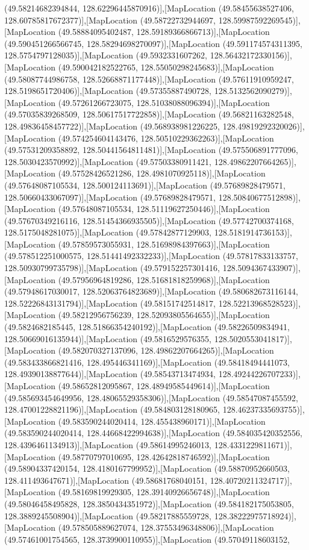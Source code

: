 (49.58214682394844, 128.62296445870916)],[MapLocation (49.58455638527406, 128.60785817672377)],[MapLocation (49.58722732944697, 128.59987592269545)],[MapLocation (49.58884095402487, 128.59189366866713)],[MapLocation (49.590451266566745, 128.58294698270097)],[MapLocation (49.591174574311395, 128.5754797128035)],[MapLocation (49.5932331607262, 128.56432172330156)],[MapLocation (49.590042182522765, 128.55050298245683)],[MapLocation (49.58087744986758, 128.52668871177448)],[MapLocation (49.57611910959247, 128.5198651720406)],[MapLocation (49.57355887490728, 128.5132562090279)],[MapLocation (49.57261266723075, 128.51038088096394)],[MapLocation (49.57035839268509, 128.50617517722858)],[MapLocation (49.56821163282548, 128.49836458457722)],[MapLocation (49.568938981226225, 128.49819292320026)],[MapLocation (49.574254604143476, 128.50510229362263)],[MapLocation (49.57531209358892, 128.50441564811481)],[MapLocation (49.575506891777096, 128.5030423570992)],[MapLocation (49.57503380911421, 128.49862207664265)],[MapLocation (49.57528426521286, 128.4981070925118)],[MapLocation (49.57648087105534, 128.500124113691)],[MapLocation (49.57689828479571, 128.50660433067097)],[MapLocation (49.57689828479571, 128.50840677512898)],[MapLocation (49.57648087105534, 128.51119627250446)],[MapLocation (49.57670349216116, 128.51454366935505)],[MapLocation (49.57742700374168, 128.5175048281075)],[MapLocation (49.57842877129903, 128.5181914736153)],[MapLocation (49.57859573055931, 128.51698984397663)],[MapLocation (49.578512251000575, 128.51441492332233)],[MapLocation (49.57817833133757, 128.50930799735798)],[MapLocation (49.579152257301416, 128.5094367433907)],[MapLocation (49.57956964819286, 128.51681818259968)],[MapLocation (49.57948617030017, 128.52063764823689)],[MapLocation (49.580682673116144, 128.52226843131794)],[MapLocation (49.58151742514817, 128.52213968528523)],[MapLocation (49.58212956756239, 128.52093805564655)],[MapLocation (49.5824682185445, 128.51866354240192)],[MapLocation (49.58226509834941, 128.50669016135944)],[MapLocation (49.5816529576355, 128.5020553041817)],[MapLocation (49.582070327137096, 128.49862207664265)],[MapLocation (49.583433866821416, 128.495446341169)],[MapLocation (49.58418494441073, 128.49390138877644)],[MapLocation (49.58543713474934, 128.49244226707233)],[MapLocation (49.58652812095867, 128.48949585449614)],[MapLocation (49.585693454649956, 128.48065529358306)],[MapLocation (49.58547087455592, 128.47001228821196)],[MapLocation (49.584803128180965, 128.46237335693755)],[MapLocation (49.583590244020414, 128.455438960171)],[MapLocation (49.583590244020414, 128.44668422994638)],[MapLocation (49.584035420352556, 128.4396461134913)],[MapLocation (49.58614995246013, 128.4331229811671)],[MapLocation (49.58770797010695, 128.42642818746592)],[MapLocation (49.58904337420154, 128.4180167799952)],[MapLocation (49.58870952660503, 128.411493647671)],[MapLocation (49.58681768040151, 128.40720211324717)],[MapLocation (49.58169819929305, 128.39140926656748)],[MapLocation (49.58046458495828, 128.3850434351972)],[MapLocation (49.584182175053805, 128.3889245508904)],[MapLocation (49.58217885559728, 128.38222975718924)],[MapLocation (49.578505889627074, 128.37553496348806)],[MapLocation (49.57461001754565, 128.3739900110955)],[MapLocation (49.57049118603152, 